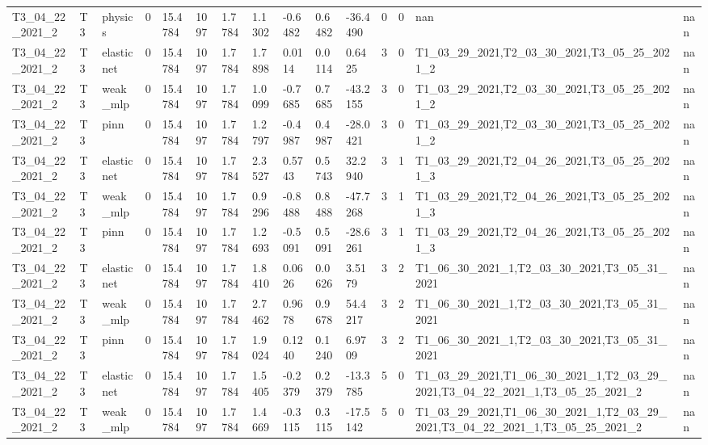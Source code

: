 \begin{table}[t]
\begin{tabular}{lllllllllllllll}
T3\_04\_22\_2021\_2 & T3 & physics & 0 & 15.4784 & 1097 & 1.7784 & 1.1302 & -0.6482 & 0.6482 & -36.4490 & 0 & 0 & nan & nan \\
T3\_04\_22\_2021\_2 & T3 & elasticnet & 0 & 15.4784 & 1097 & 1.7784 & 1.7898 & 0.0114 & 0.0114 & 0.6425 & 3 & 0 & T1\_03\_29\_2021,T2\_03\_30\_2021,T3\_05\_25\_2021\_2 & nan \\
T3\_04\_22\_2021\_2 & T3 & weak\_mlp & 0 & 15.4784 & 1097 & 1.7784 & 1.0099 & -0.7685 & 0.7685 & -43.2155 & 3 & 0 & T1\_03\_29\_2021,T2\_03\_30\_2021,T3\_05\_25\_2021\_2 & nan \\
T3\_04\_22\_2021\_2 & T3 & pinn & 0 & 15.4784 & 1097 & 1.7784 & 1.2797 & -0.4987 & 0.4987 & -28.0421 & 3 & 0 & T1\_03\_29\_2021,T2\_03\_30\_2021,T3\_05\_25\_2021\_2 & nan \\
T3\_04\_22\_2021\_2 & T3 & elasticnet & 0 & 15.4784 & 1097 & 1.7784 & 2.3527 & 0.5743 & 0.5743 & 32.2940 & 3 & 1 & T1\_03\_29\_2021,T2\_04\_26\_2021,T3\_05\_25\_2021\_3 & nan \\
T3\_04\_22\_2021\_2 & T3 & weak\_mlp & 0 & 15.4784 & 1097 & 1.7784 & 0.9296 & -0.8488 & 0.8488 & -47.7268 & 3 & 1 & T1\_03\_29\_2021,T2\_04\_26\_2021,T3\_05\_25\_2021\_3 & nan \\
T3\_04\_22\_2021\_2 & T3 & pinn & 0 & 15.4784 & 1097 & 1.7784 & 1.2693 & -0.5091 & 0.5091 & -28.6261 & 3 & 1 & T1\_03\_29\_2021,T2\_04\_26\_2021,T3\_05\_25\_2021\_3 & nan \\
T3\_04\_22\_2021\_2 & T3 & elasticnet & 0 & 15.4784 & 1097 & 1.7784 & 1.8410 & 0.0626 & 0.0626 & 3.5179 & 3 & 2 & T1\_06\_30\_2021\_1,T2\_03\_30\_2021,T3\_05\_31\_2021 & nan \\
T3\_04\_22\_2021\_2 & T3 & weak\_mlp & 0 & 15.4784 & 1097 & 1.7784 & 2.7462 & 0.9678 & 0.9678 & 54.4217 & 3 & 2 & T1\_06\_30\_2021\_1,T2\_03\_30\_2021,T3\_05\_31\_2021 & nan \\
T3\_04\_22\_2021\_2 & T3 & pinn & 0 & 15.4784 & 1097 & 1.7784 & 1.9024 & 0.1240 & 0.1240 & 6.9709 & 3 & 2 & T1\_06\_30\_2021\_1,T2\_03\_30\_2021,T3\_05\_31\_2021 & nan \\
T3\_04\_22\_2021\_2 & T3 & elasticnet & 0 & 15.4784 & 1097 & 1.7784 & 1.5405 & -0.2379 & 0.2379 & -13.3785 & 5 & 0 & T1\_03\_29\_2021,T1\_06\_30\_2021\_1,T2\_03\_29\_2021,T3\_04\_22\_2021\_1,T3\_05\_25\_2021\_2 & nan \\
T3\_04\_22\_2021\_2 & T3 & weak\_mlp & 0 & 15.4784 & 1097 & 1.7784 & 1.4669 & -0.3115 & 0.3115 & -17.5142 & 5 & 0 & T1\_03\_29\_2021,T1\_06\_30\_2021\_1,T2\_03\_29\_2021,T3\_04\_22\_2021\_1,T3\_05\_25\_2021\_2 & nan \\

\end{tabular}
\end{table}
